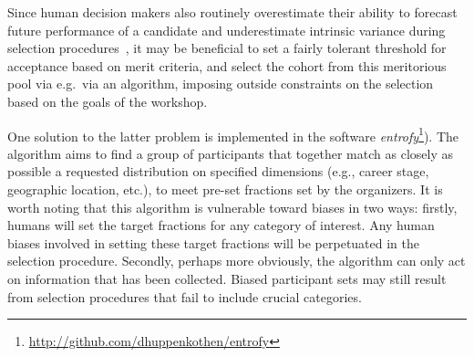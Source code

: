\documentclass{aastex62}
\begin{document}
Since human decision makers also routinely overestimate their ability to forecast future performance of a candidate and underestimate intrinsic variance during selection procedures~\citep{highhouse2008}, it may be beneficial to set a fairly tolerant threshold for acceptance based on merit criteria, and select the cohort from this meritorious pool via e.g.\ via an algorithm, imposing outside constraints on the selection based on the goals of the workshop. 

One solution to the latter problem is implemented in the software \textit{entrofy}\footnote{\url{http://github.com/dhuppenkothen/entrofy}}). 
The algorithm aims to find a group of participants that together match as closely as possible a requested distribution on specified dimensions (e.g., career stage, geographic location, etc.), to meet pre-set fractions set by the organizers.
It is worth noting that this algorithm is vulnerable toward biases in two ways: firstly, humans will set the target fractions for any category of interest.  
Any human biases involved in setting these target fractions will be perpetuated in the selection procedure. 
Secondly, perhaps more obviously, the algorithm can only act on information that has been collected.
Biased participant sets may still result from selection procedures that fail to include crucial categories. 
\end{document}
